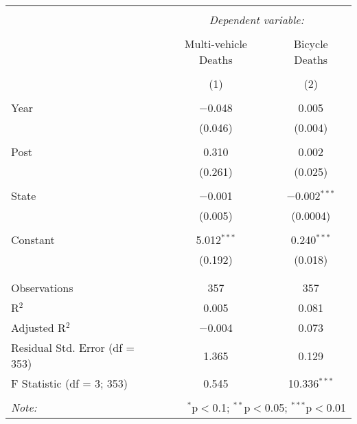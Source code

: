 \documentclass[11pt]{article}
\begin{document}
\begin{table}[!htbp] \centering 
  \caption{} 
  \label{} 
\begin{tabular}{@{\extracolsep{5pt}}lcc} 
\\[-1.8ex]\hline 
\hline \\[-1.8ex] 
 & \multicolumn{2}{c}{\textit{Dependent variable:}} \\ 
\cline{2-3} 
\\[-1.8ex] & Multi-vehicle Deaths & Bicycle Deaths \\ 
\\[-1.8ex] & (1) & (2)\\ 
\hline \\[-1.8ex] 
 Year & $-$0.048 & 0.005 \\ 
  & (0.046) & (0.004) \\ 
  & & \\ 
 Post & 0.310 & 0.002 \\ 
  & (0.261) & (0.025) \\ 
  & & \\ 
 State & $-$0.001 & $-$0.002$^{***}$ \\ 
  & (0.005) & (0.0004) \\ 
  & & \\ 
 Constant & 5.012$^{***}$ & 0.240$^{***}$ \\ 
  & (0.192) & (0.018) \\ 
  & & \\ 
\hline \\[-1.8ex] 
Observations & 357 & 357 \\ 
R$^{2}$ & 0.005 & 0.081 \\ 
Adjusted R$^{2}$ & $-$0.004 & 0.073 \\ 
Residual Std. Error (df = 353) & 1.365 & 0.129 \\ 
F Statistic (df = 3; 353) & 0.545 & 10.336$^{***}$ \\ 
\hline 
\hline \\[-1.8ex] 
\textit{Note:}  & \multicolumn{2}{r}{$^{*}$p$<$0.1; $^{**}$p$<$0.05; $^{***}$p$<$0.01} \\ 
\end{tabular} 
\end{table}
\end{document}
